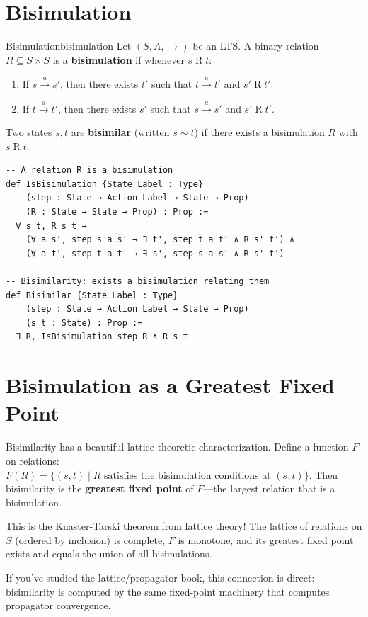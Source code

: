 \documentclass[11pt, a4paper, oneside]{book}
\newcommand{\bisim}{\sim}
\begin{document}
\section{Bisimulation}

\begin{defn}{Bisimulation}{bisimulation}
Let $(S, A, \to)$ be an LTS. A binary relation $R \subseteq S \times S$ is a
\textbf{bisimulation} if whenever $s \mathrel{R} t$:
\begin{enumerate}[nosep, label=(\roman*)]
\item If $s \xrightarrow{a} s'$, then there exists $t'$ such that
  $t \xrightarrow{a} t'$ and $s' \mathrel{R} t'$.
\item If $t \xrightarrow{a} t'$, then there exists $s'$ such that
  $s \xrightarrow{a} s'$ and $s' \mathrel{R} t'$.
\end{enumerate}
Two states $s, t$ are \textbf{bisimilar} (written $s \bisim t$) if there
exists a bisimulation $R$ with $s \mathrel{R} t$.
\end{defn}

\begin{leanbox}
\begin{verbatim}
-- A relation R is a bisimulation
def IsBisimulation {State Label : Type}
    (step : State → Action Label → State → Prop)
    (R : State → State → Prop) : Prop :=
  ∀ s t, R s t →
    (∀ a s', step s a s' → ∃ t', step t a t' ∧ R s' t') ∧
    (∀ a t', step t a t' → ∃ s', step s a s' ∧ R s' t')

-- Bisimilarity: exists a bisimulation relating them
def Bisimilar {State Label : Type}
    (step : State → Action Label → State → Prop)
    (s t : State) : Prop :=
  ∃ R, IsBisimulation step R ∧ R s t
\end{verbatim}
\end{leanbox}

\section{Bisimulation as a Greatest Fixed Point}

\begin{intuition}
Bisimilarity has a beautiful lattice-theoretic characterization. Define a
function $F$ on relations: $F(R) = \{(s,t) \mid \text{$R$ satisfies the
bisimulation conditions at $(s,t)$}\}$. Then bisimilarity is the
\textbf{greatest fixed point} of $F$---the largest relation that is a
bisimulation.

This is the Knaster-Tarski theorem from lattice theory! The lattice of
relations on $S$ (ordered by inclusion) is complete, $F$ is monotone, and
its greatest fixed point exists and equals the union of all bisimulations.

If you've studied the lattice/propagator book, this connection is direct:
bisimilarity is computed by the same fixed-point machinery that computes
propagator convergence.
\end{intuition}
\end{document}
